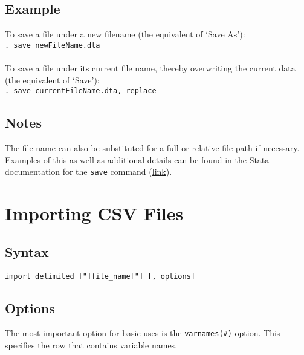 \documentclass[letterpaper,11pt]{article}
\begin{document}
\subsection{Example}
To save a file under a new filename (the equivalent of `Save As'): \\
\texttt{. {\color{Red}save} newFileName.dta}  \\
\\
To save a file under its current file name, thereby overwriting the current data (the equivalent of `Save'): \\
\texttt{. {\color{Red}save} currentFileName.dta, replace}  \\

\subsection{Notes}
The file name can also be substituted for a full or relative file path if necessary. Examples of this as well as additional details can be found in the Stata documentation for the \texttt{{\color{Red}save}} command (\href{http://www.stata.com/manuals14/dsave.pdf}{link}).\\
\newpage
\section{Importing CSV Files}
\subsection{Syntax}
\texttt{{\color{Red}import delimited} ["]file\_name["] [, options]}\\

\subsection{Options}
The most important option for basic uses is the \texttt{varnames(\#)} option. This specifies the row that contains variable names. \\
\end{document}

